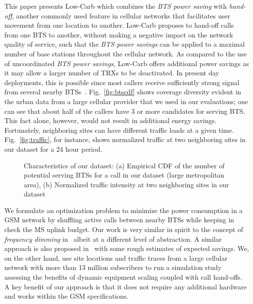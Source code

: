 This paper presents Low-Carb which combines the \textit{BTS
power saving} with \textit{hand-off}, another commonly used
feature in cellular networks that facilitates user movement
from one location to another. Low-Carb proposes to hand-off
calls from one BTS to another, without making a negative impact
on the network quality of service, such that the \textit{BTS
power savings} can be applied to a maximal number of base
stations throughout the cellular network. As compared to the
use of uncoordinated \textit{BTS power savings}, Low-Carb
offers additional power savings as it may allow a larger number
of TRXs to be deactivated. 
In present day deployments, this is possible since most callers
receive sufficiently strong signal from several nearby
BTSs~\cite{Peng:2011:BTSSaving:Mobicom}. Fig.~\ref{fig:btscdf}
shows coverage diversity evident in the urban data from a large
cellular provider that we used in our evaluations; one can see
that about half of the callers have 3 or more candidates for
serving BTS. This fact alone, however, would not result in additional energy savings. Fortunately, neighboring sites can have different traffic loads at a given time. Fig.~\ref{fig:traffic}, for instance, shows normalized traffic at two neighboring sites in our dataset for a 24 hour period.

\begin{figure}
\centering
{}
\caption{Characteristics of our dataset: (a) Empirical CDF of the number of potential serving BTSs for a call in our dataset (large metropolitan area), (b) Normalized traffic intensity at two neighboring sites in our dataset} 
\label{fig:trafficmodelstats}
\end{figure}

We formulate an optimization problem to minimize the power
consumption in a GSM network by shuffling active calls between
nearby BTSs while keeping in check the MS uplink budget. Our
work is very similar in spirit to the concept of
\textit{frequency dimming}
in~\cite{Tipper:Dimming:Globecom:2010} albeit at a different
level of abstraction. A similar approach is also proposed
in~\cite{Blume:2010:BLTJ:CellularPower} with some rough
estimates of expected savings. We, on the other hand, use site
locations and traffic traces from a large cellular network with
more than 13 million subscribers to run a simulation study
assessing the benefits of dynamic equipment scaling coupled
with call hand-offs. A key benefit of our approach is that it 
does not require any additional hardware
and works within the GSM specifications.

